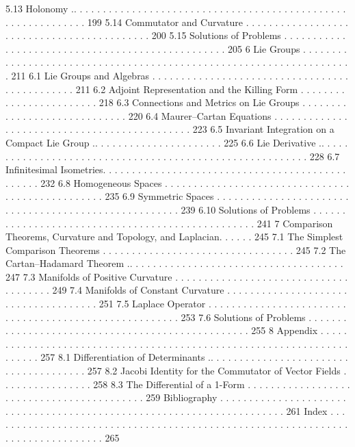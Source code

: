 \documentclass[a4paper,10pt]{article}
\begin{document}
5.13 Holonomy .. . . . . . . . . . . . . . . . . . . . . . . . . . . . . . . . . . . . . . . . . . . . . . . . . . . . . . . . . . . . . 199
5.14 Commutator and Curvature . . . . . . . . . . . . . . . . . . . . . . . . . . . . . . . . . . . . . . . . . . . 200
5.15 Solutions of Problems . . . . . . . . . . . . . . . . . . . . . . . . . . . . . . . . . . . . . . . . . . . . . . . . . 205
6 Lie Groups . . . . . . . . . . . . . . . . . . . . . . . . . . . . . . . . . . . . . . . . . . . . . . . . . . . . . . . . . . . . . . . . . . . . 211
6.1 Lie Groups and Algebras . . . . . . . . . . . . . . . . . . . . . . . . . . . . . . . . . . . . . . . . . . . . . . 211
6.2 Adjoint Representation and the Killing Form . . . . . . . . . . . . . . . . . . . . . . . . 218
6.3 Connections and Metrics on Lie Groups . . . . . . . . . . . . . . . . . . . . . . . . . . . . . 220
6.4 Maurer–Cartan Equations . . . . . . . . . . . . . . . . . . . . . . . . . . . . . . . . . . . . . . . . . . . . . 223
6.5 Invariant Integration on a Compact Lie Group .. . . . . . . . . . . . . . . . . . . . . . 225
6.6 Lie Derivative .. . . . . . . . . . . . . . . . . . . . . . . . . . . . . . . . . . . . . . . . . . . . . . . . . . . . . . . . . 228
6.7 Infinitesimal Isometries. . . . . . . . . . . . . . . . . . . . . . . . . . . . . . . . . . . . . . . . . . . . . . . . 232
6.8 Homogeneous Spaces . . . . . . . . . . . . . . . . . . . . . . . . . . . . . . . . . . . . . . . . . . . . . . . . . 235
6.9 Symmetric Spaces . . . . . . . . . . . . . . . . . . . . . . . . . . . . . . . . . . . . . . . . . . . . . . . . . . . . . 239
6.10 Solutions of Problems . . . . . . . . . . . . . . . . . . . . . . . . . . . . . . . . . . . . . . . . . . . . . . . . . 241
7 Comparison Theorems, Curvature and Topology, and Laplacian. . . . . . 245
7.1 The Simplest Comparison Theorems . . . . . . . . . . . . . . . . . . . . . . . . . . . . . . . . . 245
7.2 The Cartan–Hadamard Theorem .. . . . . . . . . . . . . . . . . . . . . . . . . . . . . . . . . . . . . 247
7.3 Manifolds of Positive Curvature . . . . . . . . . . . . . . . . . . . . . . . . . . . . . . . . . . . . . . 249
7.4 Manifolds of Constant Curvature . . . . . . . . . . . . . . . . . . . . . . . . . . . . . . . . . . . . . 251
7.5 Laplace Operator . . . . . . . . . . . . . . . . . . . . . . . . . . . . . . . . . . . . . . . . . . . . . . . . . . . . . . 253
7.6 Solutions of Problems . . . . . . . . . . . . . . . . . . . . . . . . . . . . . . . . . . . . . . . . . . . . . . . . . 255
8 Appendix . . . . . . . . . . . . . . . . . . . . . . . . . . . . . . . . . . . . . . . . . . . . . . . . . . . . . . . . . . . . . . . . . . . . . . 257
8.1 Differentiation of Determinants .. . . . . . . . . . . . . . . . . . . . . . . . . . . . . . . . . . . . . . 257
8.2 Jacobi Identity for the Commutator of Vector Fields . . . . . . . . . . . . . . . . 258
8.3 The Differential of a 1-Form . . . . . . . . . . . . . . . . . . . . . . . . . . . . . . . . . . . . . . . . . . 259
Bibliography . . . . . . . . . . . . . . . . . . . . . . . . . . . . . . . . . . . . . . . . . . . . . . . . . . . . . . . . . . . . . . . . . . . . . . 261
Index . . . . . . . . . . . . . . . . . . . . . . . . . . . . . . . . . . . . . . . . . . . . . . . . . . . . . . . . . . . . . . . . . . . . . . . . . . . . . . . 265
\end{document}
